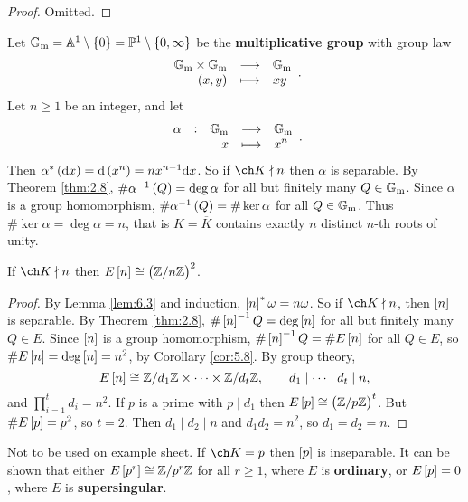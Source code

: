 \begin{proof}
Omitted.
\end{proof}


\begin{example*}
Let $ \GG_\m = \AA^1 \setminus \cbr{0} = \PP^1 \setminus \cbr{0, \infty} $ be the \textbf{multiplicative group} with group law
$$ \function{\GG_\m \times \GG_\m}{\GG_\m}{\br{x, y}}{xy}. $$
Let $ n \ge 1 $ be an integer, and let
$$ \function[\alpha]{\GG_\m}{\GG_\m}{x}{x^n}. $$
Then $ \alpha^*\br{\d x} = \d\br{x^n} = nx^{n - 1}\d x $. So if $ \ch K \nmid n $ then $ \alpha $ is separable. By Theorem \ref{thm:2.8}, $ \#\alpha^{-1}\br{Q} = \deg \alpha $ for all but finitely many $ Q \in \mathbb{G}_{\mathrm{m}} $. Since $ \alpha $ is a group homomorphism, $ \#\alpha^{-1}\br{Q} = \#\ker \alpha $ for all $ Q \in \mathbb{G}_{\mathrm{m}} $. Thus $ \#\ker \alpha = \deg \alpha = n $, that is $ K = \overline{K} $ contains exactly $ n $ distinct $ n $-th roots of unity.
\end{example*}

\begin{theorem}
\label{thm:6.5}
If $ \ch K \nmid n $ then $ E\sbr{n} \cong \br{\ZZ / n\ZZ}^2 $.
\end{theorem}

\begin{proof}
By Lemma \ref{lem:6.3} and induction, $ \sbr{n}^*\omega = n\omega $. So if $ \ch K \nmid n $, then $ \sbr{n} $ is separable. By Theorem \ref{thm:2.8}, $ \#\sbr{n}^{-1}Q = \deg \sbr{n} $ for all but finitely many $ Q \in E $. Since $ \sbr{n} $ is a group homomorphism, $ \#\sbr{n}^{-1}Q = \#E\sbr{n} $ for all $ Q \in E $, so $ \#E\sbr{n} = \deg \sbr{n} = n^2 $, by Corollary \ref{cor:5.8}. By group theory,
$$ E\sbr{n} \cong \ZZ / d_1\ZZ \times \dots \times \ZZ / d_t\ZZ, \qquad d_1 \mid \dots \mid d_t \mid n, $$
and $ \prod_{i = 1}^t d_i = n^2 $. If $ p $ is a prime with $ p \mid d_1 $ then $ E\sbr{p} \cong \br{\ZZ / p\ZZ}^t $. But $ \#E\sbr{p} = p^2 $, so $ t = 2 $. Then $ d_1 \mid d_2 \mid n $ and $ d_1d_2 = n^2 $, so $ d_1 = d_2 = n $.
\end{proof}

\begin{remark*}
Not to be used on example sheet. If $ \ch K = p $ then $ \sbr{p} $ is inseparable. It can be shown that either $ E\sbr{p^r} \cong \ZZ / p^r\ZZ $ for all $ r \ge 1 $, where $ E $ is \textbf{ordinary}, or $ E\sbr{p} = 0 $, where $ E $ is \textbf{supersingular}.
\end{remark*}

